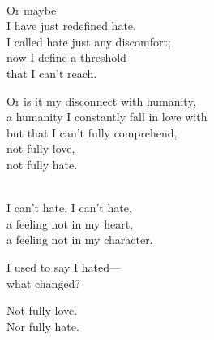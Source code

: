 \begin{lyrics}
\\
Or maybe\\
I have just redefined hate.\\
I called hate just any discomfort;\\
now I define a threshold\\
that I can’t reach.

Or is it my disconnect with humanity,\\
a humanity I constantly fall in love with\\
but that I can’t fully comprehend,\\
not fully love,\\
not fully hate.

\\
I can’t hate, I can’t hate,\\
a feeling not in my heart,\\
a feeling not in my character.

I used to say I hated—\\
what changed?

Not fully love.\\
Nor fully hate.
\end{lyrics}

